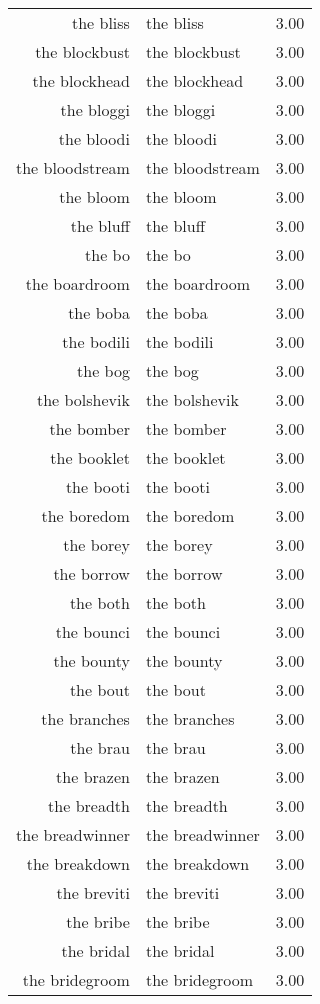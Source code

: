 \begin{table}[ht]
\begin{tabular}{rlr}
  the bliss & the bliss & 3.00 \\ 
  the blockbust & the blockbust & 3.00 \\ 
  the blockhead & the blockhead & 3.00 \\ 
  the bloggi & the bloggi & 3.00 \\ 
  the bloodi & the bloodi & 3.00 \\ 
  the bloodstream & the bloodstream & 3.00 \\ 
  the bloom & the bloom & 3.00 \\ 
  the bluff & the bluff & 3.00 \\ 
  the bo & the bo & 3.00 \\ 
  the boardroom & the boardroom & 3.00 \\ 
  the boba & the boba & 3.00 \\ 
  the bodili & the bodili & 3.00 \\ 
  the bog & the bog & 3.00 \\ 
  the bolshevik & the bolshevik & 3.00 \\ 
  the bomber & the bomber & 3.00 \\ 
  the booklet & the booklet & 3.00 \\ 
  the booti & the booti & 3.00 \\ 
  the boredom & the boredom & 3.00 \\ 
  the borey & the borey & 3.00 \\ 
  the borrow & the borrow & 3.00 \\ 
  the both & the both & 3.00 \\ 
  the bounci & the bounci & 3.00 \\ 
  the bounty & the bounty & 3.00 \\ 
  the bout & the bout & 3.00 \\ 
  the branches & the branches & 3.00 \\ 
  the brau & the brau & 3.00 \\ 
  the brazen & the brazen & 3.00 \\ 
  the breadth & the breadth & 3.00 \\ 
  the breadwinner & the breadwinner & 3.00 \\ 
  the breakdown & the breakdown & 3.00 \\ 
  the breviti & the breviti & 3.00 \\ 
  the bribe & the bribe & 3.00 \\ 
  the bridal & the bridal & 3.00 \\ 
  the bridegroom & the bridegroom & 3.00 \\ 

\end{tabular}
\end{table}
